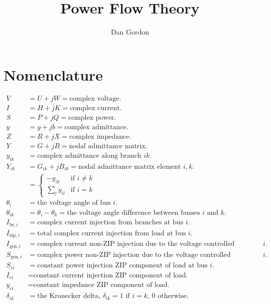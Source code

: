 \documentclass[11pt]{article}
\title{Power Flow Theory}
\author{Dan Gordon}
\date{}
\newcommand{\Vr}{\ensuremath{U}}
\newcommand{\Ir}{\ensuremath{H}}
\newcommand{\Ii}{\ensuremath{K}}
\begin{document}
\maketitle

\section{Nomenclature}
\begin{align*}
V &= \Vr + jW = \text{complex voltage.} \\
I &= \Ir + j\Ii = \text{complex current.} \\
S &= P + jQ = \text{complex power.} \\
y &= g + jb = \text{complex admittance.} \\
Z &= R + jX = \text{complex impedance.} \\
Y &= G + jB = \text{nodal admittance matrix.} \\
y_{ik} &= \text{complex admittance along branch $ik$.} \\
Y_{ik} &= G_{ik} + jB_{ik} = \text{nodal admittance matrix element $i, k$.} \\
&= 
	\begin{cases}
		-y_{ik}&\text{if $i \ne k$} \\
		\sum_l y_{il}& \text{if $i = k$}
	\end{cases} \\
\theta_{i} &= \text{the voltage angle of bus $i$.} \\
\theta_{ik} &= \theta_i - \theta_k = \text{the voltage angle difference between busses $i$ and $k$.} \\
I_{\text{br},i} &= \text{complex current injection from branches at bus $i$.} \\
I_{\text{zip},i} &= \text{total complex current injection from load at bus $i$.} \\
I_{\text{gen},i} &= \text{complex current non-ZIP injection due to the voltage controlled generation at bus $i$.} \\
S_{\text{gen},i} &= \text{complex power non-ZIP injection due to the voltage controlled generation at bus $i$.} \\
S_{ci} &= \text{constant power injection ZIP component of load at bus $i$.} \\
I_{ci} &= \text{constant current injection ZIP component of load.} \\
y_{ci} &= \text{constant impedance ZIP component of load.} \\
\delta_{ik} &= \text{the Kronecker delta, $\delta_{ik} = 1$ if $i = k$, 0 otherwise.}
\end{align*}
\end{document}
